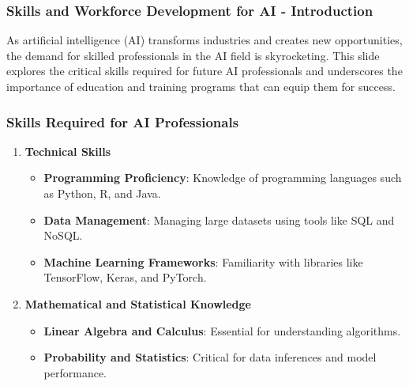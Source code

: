 \documentclass{beamer}
\begin{document}
\begin{frame}[fragile]
    \frametitle{Skills and Workforce Development for AI - Introduction}
    As artificial intelligence (AI) transforms industries and creates new opportunities, the demand for skilled professionals in the AI field is skyrocketing. This slide explores the critical skills required for future AI professionals and underscores the importance of education and training programs that can equip them for success.
\end{frame}

\begin{frame}[fragile]
    \frametitle{Skills Required for AI Professionals}
    \begin{enumerate}
        \item \textbf{Technical Skills}
            \begin{itemize}
                \item \textbf{Programming Proficiency}: Knowledge of programming languages such as Python, R, and Java.
                \item \textbf{Data Management}: Managing large datasets using tools like SQL and NoSQL.
                \item \textbf{Machine Learning Frameworks}: Familiarity with libraries like TensorFlow, Keras, and PyTorch.
            \end{itemize}
            
        \item \textbf{Mathematical and Statistical Knowledge}
            \begin{itemize}
                \item \textbf{Linear Algebra and Calculus}: Essential for understanding algorithms.
                \item \textbf{Probability and Statistics}: Critical for data inferences and model performance.
            \end{itemize}
    \end{enumerate}
\end{frame}
\end{document}

